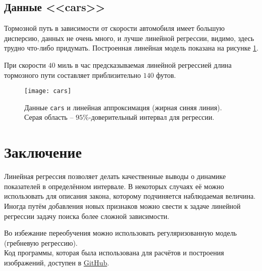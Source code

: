 \documentclass[a4paper,12pt]{article} %
\begin{document}
\newpage
\subsection{Данные <<cars>>}

Тормозной путь в зависимости от скорости автомобиля имеет большую дисперсию, данных не очень много, и лучше линейной регрессии, видимо, здесь трудно что-либо придумать. Построенная линейная модель показана на рисунке \ref{fig:cars}.

При скорости $ 40 $ миль в час предсказываемая линейной регрессией длина тормозного пути составляет приблизительно $ 140 $ футов.

\begin{figure}[H]
    \centering \texttt{[image: cars]}
    \caption{Данные \texttt{cars} и линейная аппроксимация (жирная синяя линия). Серая область -- $95\%$-доверительный интервал для регрессии. }
    \label{fig:cars}
\end{figure}

\newpage
\section{Заключение}

Линейная регрессия позволяет делать качественные выводы о динамике показателей в определённом интервале.
В некоторых случаях её можно использовать для описания закона, которому подчиняется наблюдаемая величина.
Иногда путём добавления новых признаков можно свести к задаче линейной регрессии задачу поиска более сложной зависимости.

Во избежание переобучения можно использовать регуляризованную модель (гребневую регрессию). \\

Код программы, которая была использована для расчётов и построения изображений, доступен в \href{https://github.com/zuevval/source/blob/master/r/ml/regression/regression.R}{GitHub}.
\end{document}
